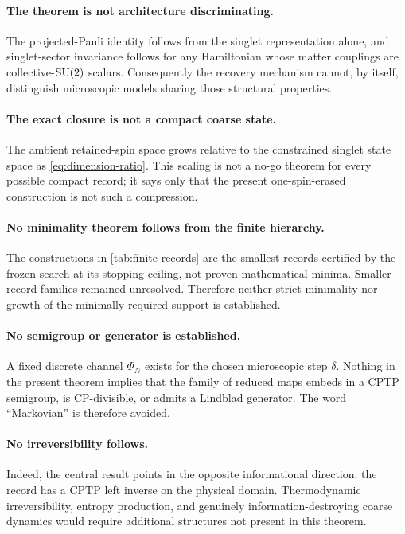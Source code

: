\paragraph{The theorem is not architecture discriminating.}
The projected-Pauli identity follows from the singlet representation alone, and singlet-sector invariance follows for any Hamiltonian whose matter couplings are collective-$\mathrm{SU}(2)$ scalars.  Consequently the recovery mechanism cannot, by itself, distinguish microscopic models sharing those structural properties.

\paragraph{The exact closure is not a compact coarse state.}
The ambient retained-spin space grows relative to the constrained singlet state space as \cref{eq:dimension-ratio}.  This scaling is not a no-go theorem for every possible compact record; it says only that the present one-spin-erased construction is not such a compression.

\paragraph{No minimality theorem follows from the finite hierarchy.}
The constructions in \cref{tab:finite-records} are the smallest records certified by the frozen search at its stopping ceiling, not proven mathematical minima.  Smaller record families remained unresolved.  Therefore neither strict minimality nor growth of the minimally required support is established.

\paragraph{No semigroup or generator is established.}
A fixed discrete channel $\Phi_N$ exists for the chosen microscopic step $\delta$.  Nothing in the present theorem implies that the family of reduced maps embeds in a CPTP semigroup, is CP-divisible, or admits a Lindblad generator.  The word ``Markovian'' is therefore avoided.

\paragraph{No irreversibility follows.}
Indeed, the central result points in the opposite informational direction: the record has a CPTP left inverse on the physical domain.  Thermodynamic irreversibility, entropy production, and genuinely information-destroying coarse dynamics would require additional structures not present in this theorem.

